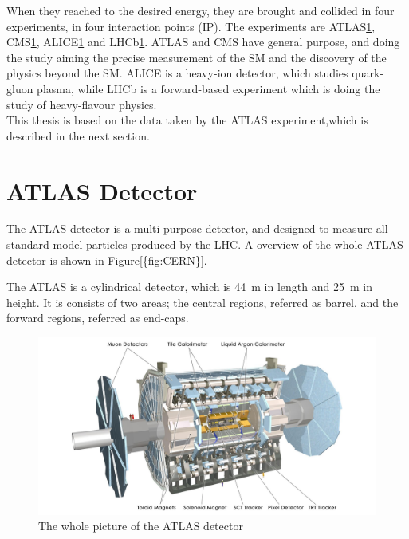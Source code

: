 When they reached to the desired energy, they are brought and collided in four experiments, in four interaction points (IP). 
The experiments are ATLAS\ref{}, CMS\ref{}, ALICE\ref{} and LHCb\ref{}. ATLAS and CMS have general purpose, and doing the study aiming the precise measurement of the SM and the discovery of the physics beyond the SM. ALICE is a heavy-ion detector, which studies quark-gluon plasma, while LHCb is a forward-based experiment which is doing the study of heavy-flavour physics. \\
This thesis is based on the data taken by the ATLAS experiment,which is described in the next section.

\section{ATLAS Detector}
The ATLAS detector is a multi purpose detector, and designed to measure all standard model particles produced by the LHC.
A overview of the whole ATLAS detector is shown in Figure\ref{{fig:CERN}}.

The ATLAS is a cylindrical detector, which is 44~m in length and 25~m in height. It is consists of two areas; the central regions, referred as barrel, and the forward regions, referred as end-caps.

\begin{figure}[tbp]
\begin{center}
 \includegraphics[width=1.0\textwidth,keepaspectratio]{figures/detector/ATLAS}
\caption{
The whole picture of the ATLAS detector
}
\label{fig:ATLAS}
\end{center}
\end{figure}

